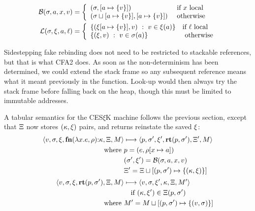 \begin{align*}
  \bind(\mstore,\maddr,\mvar,\mval) &=
   \left\{\begin{array}{ll}
            (\mstore, \snglm{\maddr}{\mval}) &\text{ if } \mvar \text{ local} \\ %
            (\joinone{\mstore}{\maddr}{\mval}, \snglm{\maddr}{\mval}) &\text{ otherwise} \\
          \end{array}\right. \\
  \lookup(\mstore,\mframe,\maddr,\mlab) &=
    \left\{\begin{array}{ll}
          \setbuild{(\extm{\mframe}{\maddr}{\set{\mval}}, \mval)}
                   {\mval \in \mframe(\maddr)} & \text{if } \mlab \text{ local} \\ %
          \setbuild{(\mframe,\mval)}{\mval \in \mstore(\maddr)} & \text{ otherwise}
           \end{array}\right.
\end{align*}

Sidestepping fake rebinding does not need to be restricted to stackable references, but that is what CFA2 does.
%
As soon as the non-determinism has been determined, we could extend the stack frame so any subsequent reference means what it meant previously in the function.
%
Look-up would then always try the stack frame before falling back on the heap, though this must be limited to immutable addresses.

A tabular semantics for the CES$\xi$K machine follows the previous section, except that $\Xi$ now stores $(\kappa, \xi)$ pairs, and returns reinstate the saved $\xi$:
\begin{align*}
  \langle v,\sigma,\xi,\mathbf{fn}{}(\lambda{} x. e,\rho){\tt :} \kappa,\Xi,M \rangle &\longmapsto
  \langle p,
    \sigma',
    \xi',
    \mathbf{rt}(p, \sigma'),
    \Xi',
    M \rangle \\
  \text{where }
  & p = (e, \rho[x \mapsto a]) \\
  & (\sigma',\xi') = {\mathcal B}(\sigma,a,x,v) \\
  & \Xi' = \Xi\sqcup[(p, \sigma') \mapsto \{ (\kappa,\xi) \}]
\\[2pt]
 \langle v, \sigma, \xi, \mathbf{rt}(p,\sigma'), \Xi, M \rangle &\longmapsto
 \langle v, \sigma, \xi', \kappa, \Xi, M' \rangle
  \\ & \quad\text{if } (\kappa,\xi') \in \Xi(p, \sigma')
  \\ \text{where } & M' = M\sqcup[(p, \sigma') \mapsto \{ (v,\sigma) \}]
\end{align*}

